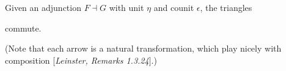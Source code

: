 \begin{lemma}
	Given an adjunction $F \dashv G$ with unit $\eta$ and counit $\epsilon$, the triangles
	\begin{center}
	\quad
	\end{center}
	commute.
\end{lemma}
(Note that each arrow is a natural transformation, which play nicely with composition [\emph{Leinster, Remarks 1.3.24}].)
